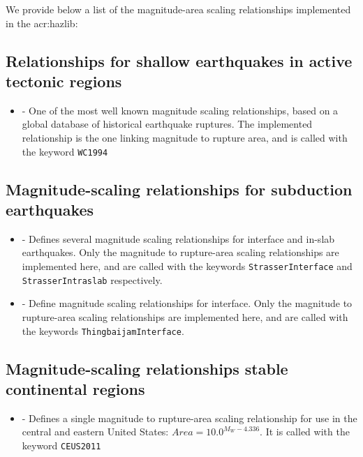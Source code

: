 We provide below a list of the magnitude-area scaling relationships
implemented in the \gls{acr:hazlib}:

\subsection{Relationships for shallow earthquakes in active tectonic regions}

\begin{itemize}

    \item \cite{wells1994} - One of the most well known magnitude scaling
	relationships, based on a global database of historical earthquake
	ruptures. The implemented relationship is the one linking magnitude to
	rupture area, and is called with the keyword \verb=WC1994=

\end{itemize}


\subsection{Magnitude-scaling relationships for subduction earthquakes}
\begin{itemize}
    \item \cite{Strasser2010} - Defines several magnitude scaling relationships for interface and in-slab earthquakes. Only the magnitude to rupture-area scaling relationships are implemented here, and are called with the keywords \verb=StrasserInterface= and \verb=StrasserIntraslab= respectively.
    \item \cite{Thingbaijam2017} - Define  magnitude scaling relationships for interface. Only the magnitude to rupture-area scaling relationships are implemented here, and are called with the keywords \verb=ThingbaijamInterface=.
\end{itemize}

\subsection{Magnitude-scaling relationships stable continental regions}
\begin{itemize}
    \item \cite{ceus2011} - Defines a single magnitude to rupture-area scaling relationship for use in the central and eastern United States: $Area = 10.0^{M_W - 4.336}$. It is called with the keyword \verb=CEUS2011=
\end{itemize}

